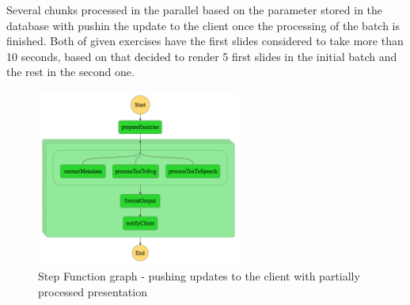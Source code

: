 Several chunks processed in the parallel based on the parameter stored in the database with pushin the update to the client once the processing of the batch is finished. Both of given exercises have the first slides considered to take more than 10 seconds, based on that decided to render 5 first slides in the initial batch and the rest in the second one.

\begin{figure}[H]
    \centering
    \includegraphics[width=0.6\textwidth]{assets/04-serverless-for-web-apps/stepFunctionGraphInitialBatch.png}
    \caption{Step Function graph - pushing updates to the client with partially processed presentation}
    \label{fig:step-function-pushing-updates-to-the-client-with-partially-processed-presentation}
\end{figure}

\datasetUploadInitialBatch

